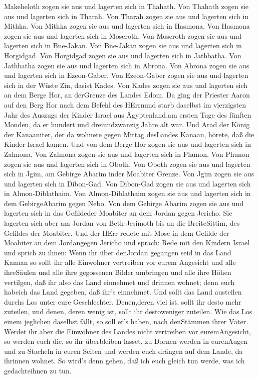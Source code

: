 Makeheloth zogen sie aus und lagerten sich in Thahath.  Von
Thahath zogen sie aus und lagerten sich in Tharah.  Von
Tharah zogen sie aus und lagerten sich in Mithka.  Von
Mithka zogen sie aus und lagerten sich in Hasmona.  Von
Hasmona zogen sie aus und lagerten sich in Moseroth.  Von
Moseroth zogen sie aus und lagerten sich in Bne-Jakan.  Von
Bne-Jakan zogen sie aus und lagerten sich in Horgidgad. 
Von Horgidgad zogen sie aus und lagerten sich in Jathbatha.
 Von Jathbatha zogen sie aus und lagerten sich in Abrona.
 Von Abrona zogen sie aus und lagerten sich in Ezeon-Gaber.
 Von Ezeon-Gaber zogen sie aus und lagerten sich in der
Wüste Zin, dasist Kades.  Von Kades zogen sie aus und
lagerten sich an dem Berge Hor, an derGrenze des Landes Edom.
 Da ging der Priester Aaron auf den Berg Hor nach dem
Befehl des HErrnund starb daselbst im vierzigsten Jahr des Auszugs der
Kinder Israel aus Ägyptenland,am ersten Tage des fünften Monden,
 da er hundert und dreiundzwanzig Jahre alt war.
 Und Arad der König der Kanaaniter, der da wohnete gegen
Mittag desLandes Kanaan, hörete, daß die Kinder Israel kamen.
 Und von dem Berge Hor zogen sie aus und lagerten sich in
Zalmona.  Von Zalmona zogen sie aus und lagerten sich in
Phunon.  Von Phunon zogen sie aus und lagerten sich in
Oboth.  Von Oboth zogen sie aus und lagerten sich in Jgim,
am Gebirge Abarim inder Moabiter Grenze.  Von Jgim zogen
sie aus und lagerten sich in Dibon-Gad.  Von Dibon-Gad
zogen sie aus und lagerten sich in Almon-Diblathaim.  Von
Almon-Diblathaim zogen sie aus und lagerten sich in dem GebirgeAbarim
gegen Nebo.  Von dem Gebirge Abarim zogen sie aus und
lagerten sich in das Gefildeder Moabiter an dem Jordan gegen Jericho.
 Sie lagerten sich aber am Jordan von Beth-Jesimoth bis an
die BreiteSittim, des Gefildes der Moabiter.  Und der HErr
redete mit Mose in dem Gefilde der Moabiter an dem Jordangegen Jericho
und sprach:  Rede mit den Kindern Israel und sprich zu
ihnen: Wenn ihr über denJordan gegangen seid in das Land Kanaan
 so sollt ihr alle Einwohner vertreiben vor eurem Angesicht
und alle ihreSäulen und alle ihre gegossenen Bilder umbringen und alle
ihre Höhen vertilgen,  daß ihr also das Land einnehmet und
drinnen wohnet; denn euch habeich das Land gegeben, daß ihr's einnehmet.
 Und sollt das Land austeilen durchs Los unter eure
Geschlechter. Denen,deren viel ist, sollt ihr desto mehr zuteilen, und
denen, deren wenig ist, sollt ihr destoweniger zuteilen. Wie das Los
einem jeglichen daselbst fällt, so soll er's haben, nach denStämmen
ihrer Väter.  Werdet ihr aber die Einwohner des Landes
nicht vertreiben vor euremAngesicht, so werden euch die, so ihr
überbleiben lasset, zu Dornen werden in eurenAugen und zu Stacheln in
euren Seiten und werden euch drängen auf dem Lande, da ihrinnen wohnet.
 So wird's denn gehen, daß ich euch gleich tun werde, was
ich gedachteihnen zu tun.

